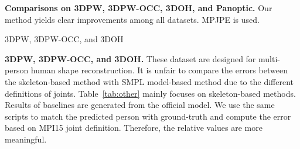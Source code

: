 \begin{table}[t]
    \renewcommand\arraystretch{0.9}
    \caption{\textbf{Comparisons on 3DPW, 3DPW-OCC, 3DOH, and Panoptic.} Our method yields clear improvements among all datasets. MPJPE is used.}
    \label{tab:other}
    \begin{subtable}[t]{0.43\textwidth}
        \caption{3DPW, 3DPW-OCC, and 3DOH}
    \end{subtable}
    \begin{subtable}[t]{.52\textwidth}
        \caption{CMU Panoptic}
    \end{subtable}
\end{table}

\noindent\textbf{3DPW, 3DPW-OCC, and 3DOH.}
These dataset are designed for multi-person human shape reconstruction. It is unfair to compare the errors between the skeleton-based method with SMPL model-based method due to the different definitions of joints. Table~\ref{tab:other} mainly focuses on skeleton-based methods. Results of baselines are generated from the official model. We use the same scripts to match the predicted person with ground-truth and compute the error based on MPI15 joint definition. Therefore, the relative values are more meaningful.

